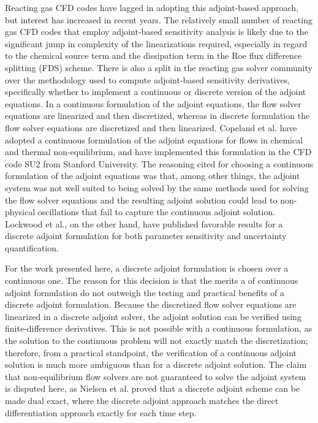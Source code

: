 Reacting gas CFD codes have lagged in adopting this adjoint-based approach, but
interest has increased in recent years\cite{Copeland, Barcelona,
lockwood2010parameter}.  The relatively small number of reacting gas CFD codes
that employ adjoint-based sensitivity analysis is likely due to the significant
jump in complexity of the linearizations required, especially in regard to the
chemical source term and the dissipation term in the Roe flux difference
splitting (FDS) scheme\cite{roe}.  There is also a split in the reacting gas
solver community over the methodology used to compute adjoint-based sensitivity
derivatives, specifically whether to implement a continuous or discrete version
of the adjoint equations.  In a continuous formulation of the adjoint equations,
the flow solver equations are linearized and then discretized, whereas in
discrete formulation the flow solver equations are discretized and then
linearized.  Copeland et al.\cite{Copeland} have adopted a continuous
formulation of the adjoint equations for flows in chemical and thermal
non-equilibrium, and have implemented this formulation in the CFD code
SU2\cite{palacios2013stanford} from Stanford University.  The reasoning cited
for choosing a continuous formulation of the adjoint equations was that, among
other things, the adjoint system was not well suited to being solved by the same
methods used for solving the flow solver equations and the resulting adjoint
solution could lead to non-physical oscillations that fail to capture the
continuous adjoint solution.  Lockwood et al.\cite{lockwood2010uncertainty,
lockwood2010parameter}, on the other hand, have published favorable results for
a discrete adjoint formulation for both parameter sensitivity and uncertainty
quantification.

For the work presented here, a discrete adjoint formulation is chosen over a
continuous one.  The reason for this decision is that the merits a of continuous
adjoint formulation do not outweigh the testing and practical benefits of a
discrete adjoint formulation.  Because the discretized flow solver equations are
linearized in a discrete adjoint solver, the adjoint solution can be verified
using finite-difference derivatives.  This is not possible with a continuous
formulation, as the solution to the continuous problem will not exactly match
the discretization; therefore, from a practical standpoint, the verification of
a continuous adjoint solution is much more ambiguous than for a discrete adjoint
solution.  The claim that non-equilibrium flow solvers are not guaranteed to
solve the adjoint system is disputed here, as Nielsen et
al.\cite{nielsen2004implicit} proved that a discrete adjoint scheme can be made
dual exact, where the discrete adjoint approach matches the direct
differentiation approach exactly for each time step.

